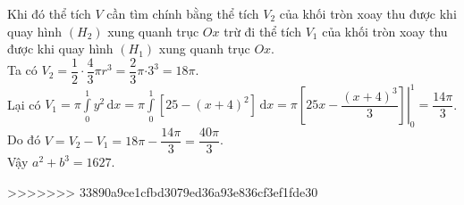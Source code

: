 \begin{ex}
{{
}
\noindent Khi đó thể tích $V$ cần tìm chính bằng thể tích $V_2$ của khối tròn xoay thu được khi quay hình $\left(H_2\right)$ xung quanh trục $Ox$ trừ đi thể tích $V_1$ của khối tròn xoay thu được khi quay hình $\left(H_1\right)$ xung quanh trục $Ox$.\\
Ta có $V_2=\dfrac{1}{2}\cdot \dfrac{4}{3}\pi r^3=\dfrac{2}{3}\pi {\cdot 3^3}=18\pi$.\\
Lại có $V_1=\pi\displaystyle\int\limits_0^1y^2\mathrm{\,d}x=\pi\displaystyle\int\limits_0^1\left[25-\left(x+4\right)^2\right]\mathrm{\,d}x=\left.\pi \left[25x-\dfrac{\left(x+4\right)^3}{3}\right]\right|_0^1
=\dfrac{14\pi}{3}$.\\
Do đó $V=V_2-V_1=18\pi-\dfrac{14\pi}{3}=\dfrac{40\pi}{3}$.\\
Vậy $a^2+b^3=1627$.
}
\end{ex}
>>>>>>> 33890a9ce1cfbd3079ed36a93e836cf3ef1fde30
